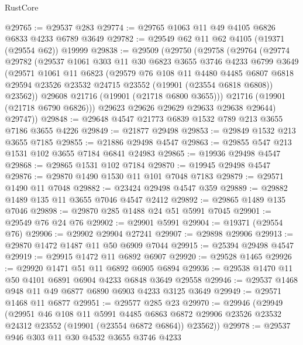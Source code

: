 \begin{lexlean}{RustCore}
\begin{coremodule}
@29765 := @29537 @283
@29774 := @29765 @1063 @11 @49 @4105 @6826 @6833 @4233 @6789 @3649
@29782 := @29549 @62 @11 @62 @4105 (@19371 (@29554 @62)) @19999
@29838 := @29509
    (@29750
      (@29758
        (@29764
          (@29774
            @29782
            (@29537
              @1061
              @303
              @11
              @30
              @6823
              @3655
              @3746
              @4233
              @6799
              @3649
              (@29571
                @1061
                @11
                @6823
                (@29579
                  @76
                  @108
                  @11
                  @4480
                  @4485
                  @6807
                  @6818
                  @29594
                  @23526
                  @23532
                  @24715
                  @23552
                  (@19901 (@23554 @6818 @6808))
                  @23562))
              @29608
              @21716
              (@19901 (@21718 @6800 @3655)))
            @21716
            (@19901 (@21718 @6790 @6826)))
          @29623
          @29626
          @29629
          @29633
          @29638
          @29644)
        @29747))
@29848 := @29648 @4547 @21773 @6839 @1532 @789 @213 @3655 @7186 @3655 @4226
@29849 := @21877 @29498
@29853 := @29849 @1532 @213 @3655 @7185
@29855 := @21886 @29498 @4547
@29863 := @29855 @547 @213 @1531 @102 @3655 @7184 @6841 @24983
@29865 := @19936 @29498 @4547
@29868 := @29865 @1531 @102 @7184
@29870 := @19945 @29498 @4547
@29876 := @29870 @1490 @1530 @11 @101 @7048 @7183
@29879 := @29571 @1490 @11 @7048
@29882 := @23424 @29498 @4547 @359
@29889 := @29882 @1489 @135 @11 @3655 @7046 @4547 @2412
@29892 := @29865 @1489 @135 @7046
@29898 := @29870 @285 @1488 @24 @51 @5991 @7045
@29901 := @29549 @76 @24 @76
@29902 := @29901 @5991
@29904 := @19371 (@29554 @76)
@29906 := @29902 @29904 @27241
@29907 := @29898 @29906
@29913 := @29870 @1472 @1487 @11 @50 @6909 @7044
@29915 := @25394 @29498 @4547
@29919 := @29915 @1472 @11 @6892 @6907
@29920 := @29528 @1465
@29926 := @29920 @1471 @51 @11 @6892 @6905 @6894
@29936 := @29538 @1470 @11 @50 @4101 @6891 @6904 @4233 @6848 @3649 @29558
@29946 := @29537 @1468 @948 @11 @49 @6877 @6890 @6903 @4233 @3125 @3649
@29949 := @29571 @1468 @11 @6877
@29951 := @29577 @285 @23
@29970 := @29946
    (@29949
      (@29951
        @46
        @108
        @11
        @5991
        @4485
        @6863
        @6872
        @29906
        @23526
        @23532
        @24312
        @23552
        (@19901 (@23554 @6872 @6864))
        @23562))
@29978 := @29537 @946 @303 @11 @30 @4532 @3655 @3746 @4233

\end{coremodule}
\end{lexlean}
